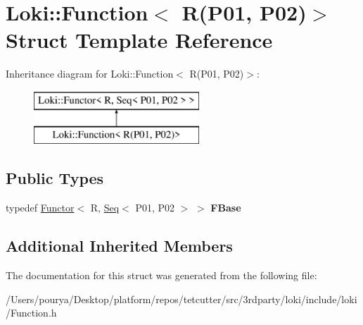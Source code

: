 \hypertarget{structLoki_1_1Function_3_01R_07P01_00_01P02_08_4}{}\section{Loki\+:\+:Function$<$ R(P01, P02)$>$ Struct Template Reference}
\label{structLoki_1_1Function_3_01R_07P01_00_01P02_08_4}
Inheritance diagram for Loki\+:\+:Function$<$ R(P01, P02)$>$\+:\begin{figure}[H]
\begin{center}
\leavevmode
\includegraphics[height=2.000000cm]{structLoki_1_1Function_3_01R_07P01_00_01P02_08_4}
\end{center}
\end{figure}
\subsection*{Public Types}
\begin{DoxyCompactItemize}
\item 
\hypertarget{structLoki_1_1Function_3_01R_07P01_00_01P02_08_4_a1e9da31d82184407f5142fa7ef87424d}{}typedef \hyperlink{classLoki_1_1Functor}{Functor}$<$ R, \hyperlink{structLoki_1_1Seq}{Seq}$<$ P01, P02 $>$ $>$ {\bfseries F\+Base}\label{structLoki_1_1Function_3_01R_07P01_00_01P02_08_4_a1e9da31d82184407f5142fa7ef87424d}

\end{DoxyCompactItemize}
\subsection*{Additional Inherited Members}


The documentation for this struct was generated from the following file\+:\begin{DoxyCompactItemize}
\item 
/\+Users/pourya/\+Desktop/platform/repos/tetcutter/src/3rdparty/loki/include/loki/Function.\+h\end{DoxyCompactItemize}
